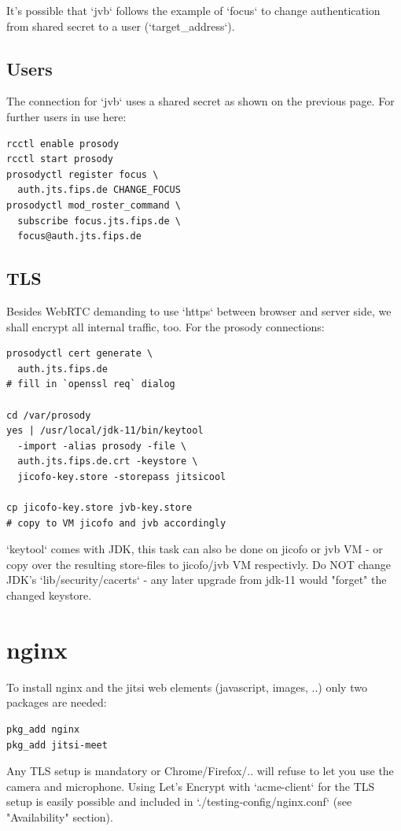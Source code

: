 \documentclass[conference]{IEEEtran}
\begin{document}
It's possible that `jvb` follows the example of
`focus` to change authentication from shared secret
to a user (`target_address`).
\subsection{Users}
The connection for `jvb` uses a shared secret as shown on the previous page.
For further users in use here:
\begin{verbatim}
rcctl enable prosody
rcctl start prosody
prosodyctl register focus \
  auth.jts.fips.de CHANGE_FOCUS
prosodyctl mod_roster_command \ 
  subscribe focus.jts.fips.de \
  focus@auth.jts.fips.de
\end{verbatim}
\subsection{TLS}
Besides WebRTC demanding to use `https` between browser and server side, we shall
encrypt all internal traffic, too. For the prosody connections:
\begin{verbatim}
prosodyctl cert generate \
  auth.jts.fips.de
# fill in `openssl req` dialog

cd /var/prosody
yes | /usr/local/jdk-11/bin/keytool
  -import -alias prosody -file \
  auth.jts.fips.de.crt -keystore \
  jicofo-key.store -storepass jitsicool
  
cp jicofo-key.store jvb-key.store 
# copy to VM jicofo and jvb accordingly
\end{verbatim}
`keytool` comes with JDK, this task can also be done on jicofo or jvb VM - or copy
over the resulting store-files to jicofo/jvb VM respectivly.
Do NOT change JDK's `lib/security/cacerts` - any later upgrade from jdk-11
would "forget" the changed keystore.

\section{nginx}
To install nginx and the jitsi web elements (javascript, images, ..) only two packages
are needed:
\begin{verbatim}
pkg_add nginx
pkg_add jitsi-meet
\end{verbatim}
Any TLS setup is mandatory or Chrome/Firefox/.. will refuse to let you
use the camera and microphone.
Using Let's Encrypt with `acme-client` for the TLS setup is easily possible and included
in `./testing-config/nginx.conf` (see "Availability" section).
\end{document}
